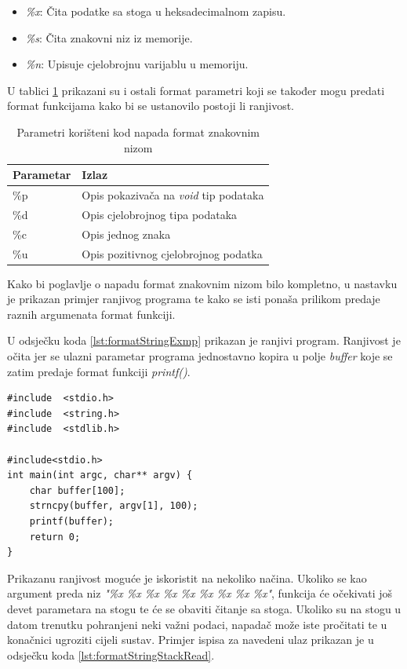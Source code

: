 \documentclass[times, utf8, diplomski, numeric]{fer}
\begin{document}
\begin{itemize}
\item \emph{\%x}: Čita podatke sa stoga u heksadecimalnom zapisu.
\item \emph{\%s}: Čita znakovni niz iz memorije.
\item \emph{\%n}: Upisuje cjelobrojnu varijablu u memoriju. 
\end{itemize}

U tablici \ref{tbl:format_parameters} prikazani su i ostali
format parametri koji se također mogu predati format funkcijama
kako bi se ustanovilo postoji li ranjivost.

\begin{table}[htb]
\small
\caption{Parametri korišteni kod napada format znakovnim nizom}
\label{tbl:format_parameters}
\centering
\begin{tabular}{|l|p{8cm}|}
\hline
Parametar & Izlaz \\ \hline
\%p & Opis pokazivača na \emph{void} tip podataka \\ \hline
\%d & Opis cjelobrojnog tipa podataka \\ \hline
\%c & Opis jednog znaka \\ \hline
\%u & Opis pozitivnog cjelobrojnog podatka \\ \hline
\end{tabular}
\end{table}

Kako bi poglavlje o napadu format znakovnim nizom bilo kompletno,
u nastavku je prikazan primjer ranjivog programa te kako se isti
ponaša prilikom predaje raznih argumenata format funkciji.

U odsječku koda \ref{lst:formatStringExmp} prikazan je ranjivi
program. Ranjivost je očita jer se ulazni parametar programa
jednostavno kopira u polje \emph{buffer} koje se zatim predaje
format funkciji \emph{printf()}. 

\begin{lstlisting}[frame=single, caption=Primjer ranjivog programa, label={lst:formatStringExmp}]
#include  <stdio.h>
#include  <string.h>
#include  <stdlib.h>

#include<stdio.h>
int main(int argc, char** argv) {
	char buffer[100];
	strncpy(buffer, argv[1], 100);
	printf(buffer);
	return 0;
}
\end{lstlisting}

Prikazanu ranjivost moguće je iskoristit na nekoliko načina.
Ukoliko se kao argument preda niz \emph{"\%x \%x \%x \%x \%x \%x
\%x \%x \%x"}, funkcija će očekivati još devet parametara na
stogu te će se obaviti čitanje sa stoga. Ukoliko su na stogu u
datom trenutku pohranjeni neki važni podaci, napadač može iste
pročitati te u konačnici ugroziti cijeli sustav. Primjer ispisa
za navedeni ulaz prikazan je u odsječku koda
\ref{lst:formatStringStackRead}.
\end{document}
